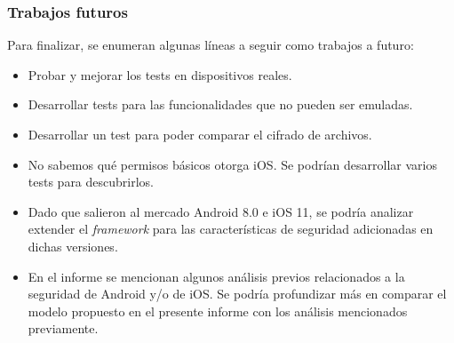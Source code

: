 \begin{frame}
 \frametitle{Trabajos futuros}
Para finalizar, se enumeran algunas líneas a seguir como trabajos a futuro:\pause
 \begin{small}
 \begin{itemize}[<+->]
    \item Probar y mejorar los tests en dispositivos reales.
    \item Desarrollar tests para las funcionalidades que no pueden ser emuladas.
    \item Desarrollar un test para poder comparar el cifrado de archivos.
    \item No sabemos qué permisos básicos otorga iOS. Se podrían desarrollar varios tests para descubrirlos.
    \item Dado que salieron al mercado Android 8.0 e iOS 11, se podría analizar extender el \emph{framework} para las características de seguridad adicionadas en dichas versiones.
    \item En el informe se mencionan algunos análisis previos relacionados a la seguridad de Android y/o de iOS. Se podría profundizar más en comparar el modelo propuesto en el presente informe con los análisis mencionados previamente.
 \end{itemize}
 \end{small}
\end{frame}

